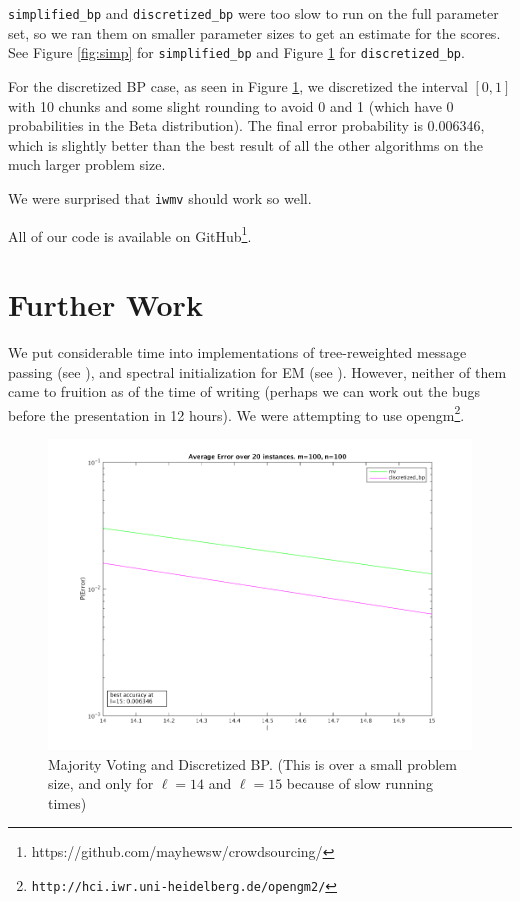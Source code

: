 \documentclass[11pt]{article}
\begin{document}
\texttt{simplified\_bp} and \texttt{discretized\_bp} were too slow to run on the full parameter set, so we ran them on smaller parameter sizes to get an estimate for the scores. See Figure \ref{fig:simp} for \texttt{simplified\_bp} and Figure \ref{fig:disc} for \texttt{discretized\_bp}.

For the discretized BP case, as seen in Figure \ref{fig:disc}, we discretized the interval $[0,1]$ with 10 chunks and some slight rounding to avoid 0 and 1 (which have 0 probabilities in the Beta distribution). The final error probability is 0.006346, which is slightly better than the best result of all the other algorithms on the much larger problem size. 

We were surprised that \texttt{iwmv} should work so well. 

All of our code is available on GitHub\footnote{https://github.com/mayhewsw/crowdsourcing/}.

\section{Further Work}
We put considerable time into implementations of tree-reweighted message passing (see \cite{kolmogorov2006convergent}), and spectral initialization for EM (see \cite{zhang2014spectral}). However, neither of them came to fruition as of the time of writing (perhaps we can work out the bugs before the presentation in 12 hours). We were attempting to use opengm\footnote{\texttt{http://hci.iwr.uni-heidelberg.de/opengm2/}}.




\begin{figure}[t]
\centering
\includegraphics[scale=0.5]{mv_discretized.png}
\caption{Majority Voting and Discretized BP. (This is over a small problem size, and only for $\ell=14$ and $\ell=15$ because of slow running times)}
\label{fig:disc}
\end{figure}
\end{document}
